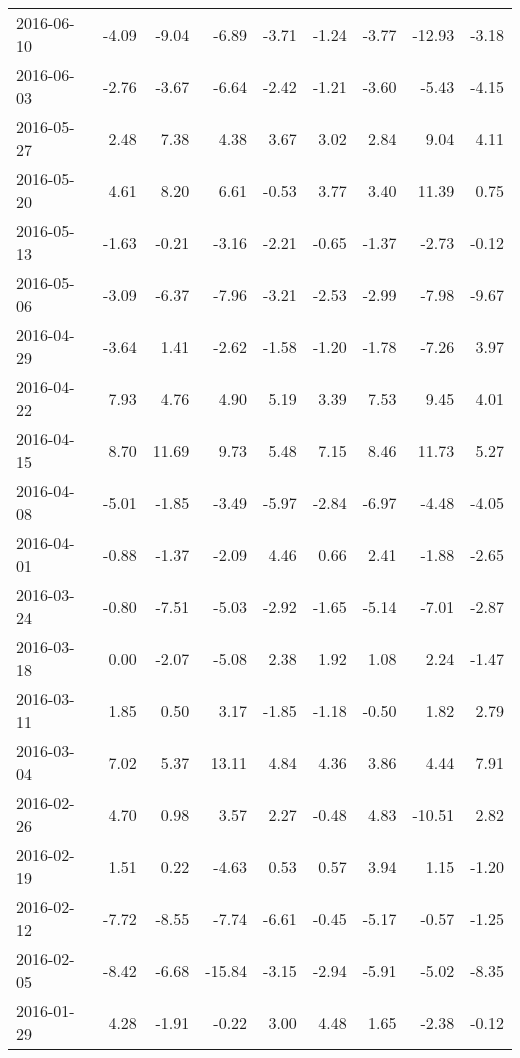 \documentclass{article}
\begin{document}
{\begin{tabular}{lrrrrrrrr}
        2016-06-10 & -4.09 & -9.04  & -6.89  & -3.71 & -1.24  & -3.77  & -12.93 & -3.18  \\
        2016-06-03 & -2.76 & -3.67  & -6.64  & -2.42 & -1.21  & -3.60  & -5.43  & -4.15  \\
        2016-05-27 & 2.48  & 7.38   & 4.38   & 3.67  & 3.02   & 2.84   & 9.04   & 4.11   \\
        2016-05-20 & 4.61  & 8.20   & 6.61   & -0.53 & 3.77   & 3.40   & 11.39  & 0.75   \\
        2016-05-13 & -1.63 & -0.21  & -3.16  & -2.21 & -0.65  & -1.37  & -2.73  & -0.12  \\
        2016-05-06 & -3.09 & -6.37  & -7.96  & -3.21 & -2.53  & -2.99  & -7.98  & -9.67  \\
        2016-04-29 & -3.64 & 1.41   & -2.62  & -1.58 & -1.20  & -1.78  & -7.26  & 3.97   \\
        2016-04-22 & 7.93  & 4.76   & 4.90   & 5.19  & 3.39   & 7.53   & 9.45   & 4.01   \\
        2016-04-15 & 8.70  & 11.69  & 9.73   & 5.48  & 7.15   & 8.46   & 11.73  & 5.27   \\
        2016-04-08 & -5.01 & -1.85  & -3.49  & -5.97 & -2.84  & -6.97  & -4.48  & -4.05  \\
        2016-04-01 & -0.88 & -1.37  & -2.09  & 4.46  & 0.66   & 2.41   & -1.88  & -2.65  \\
        2016-03-24 & -0.80 & -7.51  & -5.03  & -2.92 & -1.65  & -5.14  & -7.01  & -2.87  \\
        2016-03-18 & 0.00  & -2.07  & -5.08  & 2.38  & 1.92   & 1.08   & 2.24   & -1.47  \\
        2016-03-11 & 1.85  & 0.50   & 3.17   & -1.85 & -1.18  & -0.50  & 1.82   & 2.79   \\
        2016-03-04 & 7.02  & 5.37   & 13.11  & 4.84  & 4.36   & 3.86   & 4.44   & 7.91   \\
        2016-02-26 & 4.70  & 0.98   & 3.57   & 2.27  & -0.48  & 4.83   & -10.51 & 2.82   \\
        2016-02-19 & 1.51  & 0.22   & -4.63  & 0.53  & 0.57   & 3.94   & 1.15   & -1.20  \\
        2016-02-12 & -7.72 & -8.55  & -7.74  & -6.61 & -0.45  & -5.17  & -0.57  & -1.25  \\
        2016-02-05 & -8.42 & -6.68  & -15.84 & -3.15 & -2.94  & -5.91  & -5.02  & -8.35  \\
        2016-01-29 & 4.28  & -1.91  & -0.22  & 3.00  & 4.48   & 1.65   & -2.38  & -0.12  \\

\end{tabular}}
\end{document}
